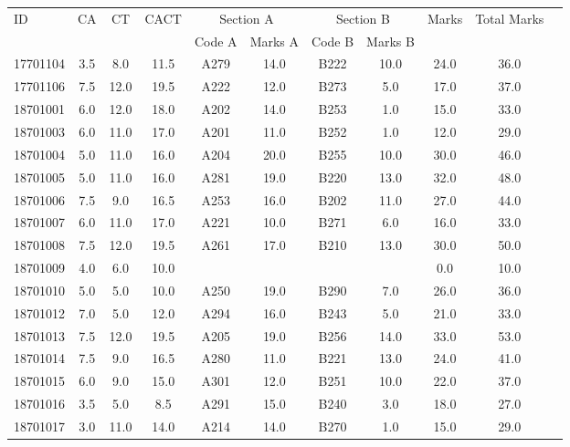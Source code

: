 \documentclass[12pt]{article}
\begin{document}
    \begin{center} 
	\renewcommand{\arraystretch}{1.08}
	\begin{small}
    \begin{tabular}{|l|c|c|c|c|c|c|c|c|c|c|} \hline
	\multirow{2}{*}{ID} & 	\multirow{2}{*}{CA}  & 	\multirow{2}{*}{CT}  & 	\multirow{2}{*}{CACT}  & \multicolumn{2 }{c|}{Section A}& \multicolumn{2 }{c|}{Section B} & 	\multirow{2}{*}{Marks}  & 	\multirow{2}{*}{Total Marks}  \\ 
	&  &  &  & Code A & Marks A & Code B & Marks B&  &  \\ \hline
17701104 & 3.5 & 8.0 & 11.5 & A279 & 14.0 & B222 & 10.0 & 24.0 & 36.0\\ \hline 
17701106 & 7.5 & 12.0 & 19.5 & A222 & 12.0 & B273 & 5.0 & 17.0 & 37.0\\ \hline 
18701001 & 6.0 & 12.0 & 18.0 & A202 & 14.0 & B253 & 1.0 & 15.0 & 33.0\\ \hline 
18701003 & 6.0 & 11.0 & 17.0 & A201 & 11.0 & B252 & 1.0 & 12.0 & 29.0\\ \hline 
18701004 & 5.0 & 11.0 & 16.0 & A204 & 20.0 & B255 & 10.0 & 30.0 & 46.0\\ \hline 
18701005 & 5.0 & 11.0 & 16.0 & A281 & 19.0 & B220 & 13.0 & 32.0 & 48.0\\ \hline 
18701006 & 7.5 & 9.0 & 16.5 & A253 & 16.0 & B202 & 11.0 & 27.0 & 44.0\\ \hline 
18701007 & 6.0 & 11.0 & 17.0 & A221 & 10.0 & B271 & 6.0 & 16.0 & 33.0\\ \hline 
18701008 & 7.5 & 12.0 & 19.5 & A261 & 17.0 & B210 & 13.0 & 30.0 & 50.0\\ \hline 
18701009 & 4.0 & 6.0 & 10.0 &  &  &  &  & 0.0 & 10.0\\ \hline 
18701010 & 5.0 & 5.0 & 10.0 & A250 & 19.0 & B290 & 7.0 & 26.0 & 36.0\\ \hline 
18701012 & 7.0 & 5.0 & 12.0 & A294 & 16.0 & B243 & 5.0 & 21.0 & 33.0\\ \hline 
18701013 & 7.5 & 12.0 & 19.5 & A205 & 19.0 & B256 & 14.0 & 33.0 & 53.0\\ \hline 
18701014 & 7.5 & 9.0 & 16.5 & A280 & 11.0 & B221 & 13.0 & 24.0 & 41.0\\ \hline 
18701015 & 6.0 & 9.0 & 15.0 & A301 & 12.0 & B251 & 10.0 & 22.0 & 37.0\\ \hline 
18701016 & 3.5 & 5.0 & 8.5 & A291 & 15.0 & B240 & 3.0 & 18.0 & 27.0\\ \hline 
18701017 & 3.0 & 11.0 & 14.0 & A214 & 14.0 & B270 & 1.0 & 15.0 & 29.0\\ \hline 

\end{tabular}
\end{small}
\end{center}
\end{document}
